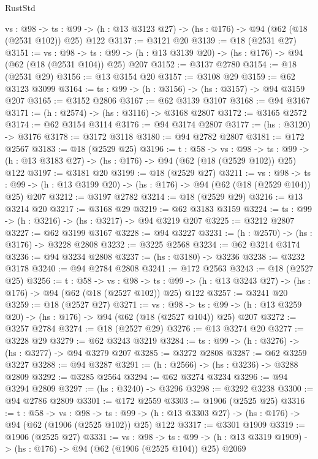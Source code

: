 \begin{lexlean}{RustStd}
\begin{coremodule}
  {vs : @98} ->
  {ts : @99} -> (h : @13 @3123 @27) -> (hs : @176) -> @94 (@62 (@18 (@2531 @102)) @25) @122
@3137 := @3121 @20
@3139 := @18 (@2531 @27)
@3151 := {vs : @98} ->
  {ts : @99} -> (h : @13 @3139 @20) -> (hs : @176) -> @94 (@62 (@18 (@2531 @104)) @25) @207
@3152 := @3137 @2780
@3154 := @18 (@2531 @29)
@3156 := @13 @3154 @20
@3157 := @3108 @29
@3159 := @62 @3123 @3099
@3164 := {ts : @99} -> (h : @3156) -> (hs : @3157) -> @94 @3159 @207
@3165 := @3152 @2806
@3167 := @62 @3139 @3107
@3168 := @94 @3167
@3171 := (h : @2574) -> (hs : @3116) -> @3168 @2807
@3172 := @3165 @2572
@3174 := @62 @3154 @3114
@3176 := @94 @3174 @2807
@3177 := (hs : @3120) -> @3176
@3178 := @3172 @3118
@3180 := @94 @2782 @2807
@3181 := @172 @2567
@3183 := @18 (@2529 @25)
@3196 := {t : @58} ->
  {vs : @98} ->
  {ts : @99} -> (h : @13 @3183 @27) -> (hs : @176) -> @94 (@62 (@18 (@2529 @102)) @25) @122
@3197 := @3181 @20
@3199 := @18 (@2529 @27)
@3211 := {vs : @98} ->
  {ts : @99} -> (h : @13 @3199 @20) -> (hs : @176) -> @94 (@62 (@18 (@2529 @104)) @25) @207
@3212 := @3197 @2782
@3214 := @18 (@2529 @29)
@3216 := @13 @3214 @20
@3217 := @3168 @29
@3219 := @62 @3183 @3159
@3224 := {ts : @99} -> (h : @3216) -> (hs : @3217) -> @94 @3219 @207
@3225 := @3212 @2807
@3227 := @62 @3199 @3167
@3228 := @94 @3227
@3231 := (h : @2570) -> (hs : @3176) -> @3228 @2808
@3232 := @3225 @2568
@3234 := @62 @3214 @3174
@3236 := @94 @3234 @2808
@3237 := (hs : @3180) -> @3236
@3238 := @3232 @3178
@3240 := @94 @2784 @2808
@3241 := @172 @2563
@3243 := @18 (@2527 @25)
@3256 := {t : @58} ->
  {vs : @98} ->
  {ts : @99} -> (h : @13 @3243 @27) -> (hs : @176) -> @94 (@62 (@18 (@2527 @102)) @25) @122
@3257 := @3241 @20
@3259 := @18 (@2527 @27)
@3271 := {vs : @98} ->
  {ts : @99} -> (h : @13 @3259 @20) -> (hs : @176) -> @94 (@62 (@18 (@2527 @104)) @25) @207
@3272 := @3257 @2784
@3274 := @18 (@2527 @29)
@3276 := @13 @3274 @20
@3277 := @3228 @29
@3279 := @62 @3243 @3219
@3284 := {ts : @99} -> (h : @3276) -> (hs : @3277) -> @94 @3279 @207
@3285 := @3272 @2808
@3287 := @62 @3259 @3227
@3288 := @94 @3287
@3291 := (h : @2566) -> (hs : @3236) -> @3288 @2809
@3292 := @3285 @2564
@3294 := @62 @3274 @3234
@3296 := @94 @3294 @2809
@3297 := (hs : @3240) -> @3296
@3298 := @3292 @3238
@3300 := @94 @2786 @2809
@3301 := @172 @2559
@3303 := @1906 (@2525 @25)
@3316 := {t : @58} ->
  {vs : @98} ->
  {ts : @99} -> (h : @13 @3303 @27) -> (hs : @176) -> @94 (@62 (@1906 (@2525 @102)) @25) @122
@3317 := @3301 @1909
@3319 := @1906 (@2525 @27)
@3331 := {vs : @98} ->
  {ts : @99} -> (h : @13 @3319 @1909) -> (hs : @176) -> @94 (@62 (@1906 (@2525 @104)) @25) @2069

\end{coremodule}
\end{lexlean}
